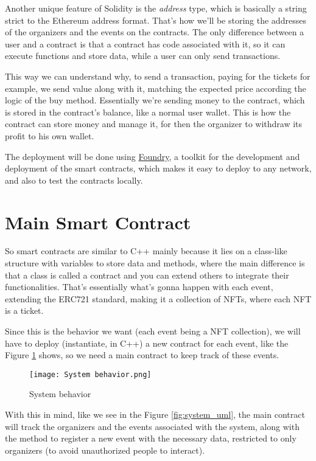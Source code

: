 Another unique feature of Solidity is the \textit{address} type, which is
basically a string strict to the Ethereum address format. That's how we'll be
storing the addresses of the organizers and the events on the contracts. The
only difference between a user and a contract is that a contract has code
associated with it, so it can execute functions and store data, while a user
can only send transactions.

This way we can understand why, to send a transaction, paying for the tickets
for example, we send value along with it, matching the expected price according
the logic of the buy method. Essentially we're sending money to the contract,
which is stored in the contract's balance, like a normal user wallet. This is
how the contract can store money and manage it, for then the organizer to
withdraw its profit to his own wallet.

The deployment will be done using \href{https://book.getfoundry.sh/}{Foundry},
a toolkit for the development and deployment of the smart contracts, which
makes it easy to deploy to any network, and also to test the contracts locally.

\section{Main Smart Contract}
\label{sec:main_smart_contract}

So smart contracts are similar to C++ mainly because it lies on a class-like
structure with variables to store data and methods, where the main difference
is that a class is called a contract and you can extend others to integrate
their functionalities. That's essentially what's gonna happen with each event,
extending the ERC721 standard, making it a collection of NFTs, where each NFT
is a ticket.

Since this is the behavior we want (each event being a NFT collection), we will
have to deploy (instantiate, in C++) a new contract for each event, like the
Figure \ref{fig:system_behavior} shows, so we need a main contract to keep
track of these events.

\begin{figure}[H]
	\texttt{[image: System behavior.png]}
	\centering
	\caption{System behavior}
	\label{fig:system_behavior}
\end{figure}

With this in mind, like we see in the Figure \ref{fig:system_uml}, the main
contract will track the organizers and the events associated with the system,
along with the method to register a new event with the necessary data,
restricted to only organizers (to avoid unauthorized people to interact).

